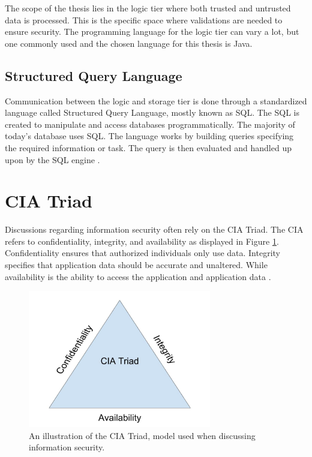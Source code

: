 The scope of the thesis lies in the logic tier where both trusted and untrusted data is processed. This is the specific space where validations are needed to ensure security. The programming language for the logic tier can vary a lot, but one commonly used and the chosen language for this thesis is Java.



\subsection{Structured Query Language}
Communication between the logic and storage tier is done through a standardized language called Structured Query Language, mostly known as SQL. The SQL is created to manipulate and access databases programmatically. The majority of today's database uses SQL. The language works by building queries specifying the required information or task. The query is then evaluated and handled up upon by the SQL engine \parencite{DarieCristian2003TPGt}.



\section{CIA Triad}
\label{cia}
Discussions regarding information security often rely on the CIA Triad. The CIA refers to confidentiality, integrity, and availability as displayed in Figure \ref{fig:CIATriad}. Confidentiality ensures that authorized individuals only use data. Integrity specifies that application data should be accurate and unaltered. While availability is the ability to access the application and application data \parencite{2014C1-W}.

\begin{figure}[H]
    \centering
    \includegraphics[height=6cm]{images/CIATriad.jpg}
    \caption{An illustration of the CIA Triad, model used when discussing information security.}
    \label{fig:CIATriad}
\end{figure}



